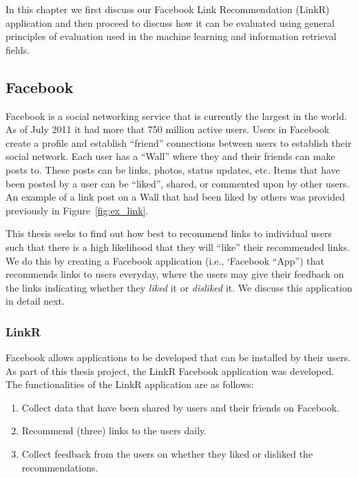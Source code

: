 In this chapter we first discuss our Facebook Link Recommendation
(LinkR) application and then proceed to discuss how it can be
evaluated using general principles of evaluation used in the
machine learning and information retrieval fields.

\subsection{Facebook}

Facebook is a social networking service that is currently the largest
in the world. As of July 2011 it had more that 750 million active
users. Users in Facebook create a profile and establish ``friend''
connections between users to establish their social network. Each user
has a ``Wall'' where they and their friends can make posts to.  These
posts can be links, photos, status updates, etc.  Items that have been
posted by a user can be ``liked'', shared, or commented upon by other
users.  An example of a link post on a Wall that had been liked
by others was provided previously in Figure~\ref{fig:ex_link}.


This thesis seeks to find out how best to recommend links to
individual users such that there is a high likelihood that they will
``like'' their recommended links.  We do this by creating a
Facebook application (i.e., `Facebook ``App'') that recommends links
to users everyday, where the users may give their feedback on the
links indicating whether they \emph{liked} it or \emph{disliked} it.
We discuss this application in detail next.

\subsubsection{LinkR}

Facebook allows applications to be developed that can be installed by
their users.  As part of this thesis project, the LinkR Facebook
application was developed.  The functionalities of the LinkR application
are as follows:
\begin{enumerate}
\item{Collect data that have been shared by users and their friends on Facebook.}
\item{Recommend (three) links to the users daily.}
\item{Collect feedback from the users on whether they liked or disliked the recommendations.}
\end{enumerate}

